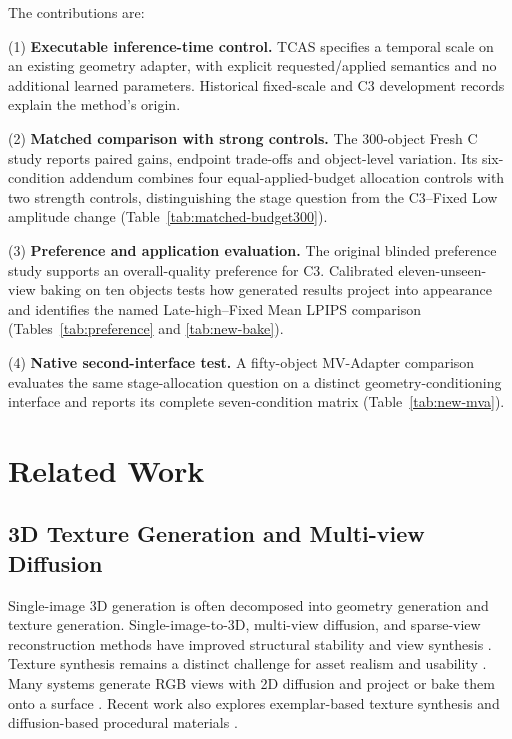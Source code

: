 \documentclass[times,twocolumn,final]{elsarticle}
\providecommand{\DIFadd}[1]{{\protect\color{blue} \sf #1}} %
\providecommand{\DIFaddbegin}{} %
\providecommand{\DIFaddend}{} %
\begin{document}
The   \DIFaddbegin \DIFadd{contributions are}\DIFaddend :

(1)   \DIFaddbegin \DIFadd{\textbf{Executable inference-time control.} TCAS specifies a temporal scale on an existing geometry adapter, with explicit requested/applied semantics and no additional learned parameters. Historical fixed-scale and C3 development records explain the method's origin}\DIFaddend .

(2)   \DIFaddbegin \DIFadd{\textbf{Matched comparison with strong controls.} The 300-object Fresh C study reports paired gains, endpoint trade-offs and object-level variation. Its six-condition addendum combines four equal-applied-budget allocation controls with two strength controls, distinguishing the stage question from the C3--Fixed Low amplitude change (Table~\ref{tab:matched-budget300})}\DIFaddend .

(3)   \DIFaddbegin \DIFadd{\textbf{Preference and application evaluation.} The original blinded preference study supports an overall-quality preference for C3. Calibrated eleven-unseen-view baking on ten objects tests how generated results project into appearance and identifies the named Late-high--Fixed Mean LPIPS comparison (Tables~\ref{tab:preference} and \ref{tab:new-bake})}\DIFaddend .

(4)   \DIFaddbegin \DIFadd{\textbf{Native second-interface test.} A fifty-object MV-Adapter comparison evaluates the same stage-allocation question on a distinct geometry-conditioning interface and reports its complete seven-condition matrix (Table~\ref{tab:new-mva})}\DIFaddend .

\section{Related Work}
\label{sec:related}

\subsection{3D Texture Generation and Multi-view Diffusion}
\label{subsec:3dtex}

Single-image 3D generation is often decomposed into geometry generation and texture generation.   \DIFaddbegin \DIFadd{Single-image-to-3D}\DIFaddend , multi-view diffusion, and sparse-view reconstruction methods have   \DIFaddbegin \DIFadd{improved structural stability and view synthesis \cite{liu2023zero1to3,shi2023zero123pp,liu2023syncdreamer,long2023wonder3d,shi2024mvdream,wang2023imagedream,xu2024instantmesh,ke2024era3d}. Texture synthesis remains a distinct challenge for asset }\DIFaddend realism and usability   \DIFaddbegin \DIFadd{\cite{perla2026survey}. Many systems generate RGB views with }\DIFaddend 2D   \DIFaddbegin \DIFadd{diffusion and }\DIFaddend project or bake   \DIFaddbegin \DIFadd{them onto a }\DIFaddend surface \cite{chen2023text2tex,richardson2023texture,poole2023dreamfusion,chen2023fantasia3d}.   \DIFaddbegin \DIFadd{Recent work also explores }\DIFaddend exemplar-based texture synthesis   \DIFaddbegin \DIFadd{and }\DIFaddend diffusion-based procedural   \DIFaddbegin \DIFadd{materials \cite{guzman2026adaptive,lv2025interpretable}}\DIFaddend .
\end{document}
